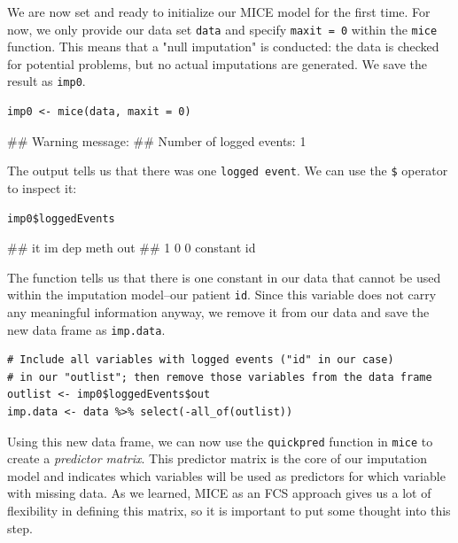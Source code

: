 We are now set and ready to initialize our \textsf{MICE} model for the first time. For now, we only provide our data set \texttt{data} and specify \texttt{maxit = 0} within the \texttt{mice} function. This means that a "null imputation" is conducted: the data is checked for potential problems, but no actual imputations are generated. We save the result as \texttt{imp0}.

\begin{lstlisting}
imp0 <- mice(data, maxit = 0)
\end{lstlisting}

\begin{example}
## Warning message:
## Number of logged events: 1 
\end{example}

The output tells us that there was one \texttt{logged event}. We can use the \texttt{\$} operator to inspect it:

\begin{lstlisting}
imp0$loggedEvents
\end{lstlisting}

\begin{example}
##   it im dep     meth out
## 1  0  0     constant  id
\end{example}

The function tells us that there is one constant in our data that cannot be used within the imputation model--our patient \texttt{id}. Since this variable does not carry any meaningful information anyway, we remove it from our data and save the new data frame as \texttt{imp.data}.

\begin{lstlisting}
# Include all variables with logged events ("id" in our case)
# in our "outlist"; then remove those variables from the data frame
outlist <- imp0$loggedEvents$out
imp.data <- data %>% select(-all_of(outlist))
\end{lstlisting}

Using this new data frame, we can now use the \texttt{quickpred} function in \texttt{mice} to create a \emph{predictor matrix}. This predictor matrix is the core of our imputation model and indicates which variables will be used as predictors for which variable with missing data. As we learned, \textsf{MICE} as an FCS approach gives us a lot of flexibility in defining this matrix, so it is important to put some thought into this step. 


